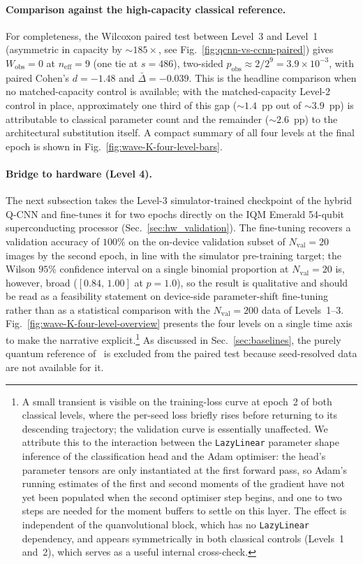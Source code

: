 \paragraph{Comparison against the high-capacity classical reference.}
For completeness, the Wilcoxon paired test between Level~3 and Level~1
(asymmetric in capacity by $\sim$$185\times$, see
Fig.~\ref{fig:qcnn-vs-ccnn-paired}) gives $W_{\mathrm{obs}}=0$
at $n_{\mathrm{eff}}=9$ (one tie at $s=486$), two-sided
$p_{\mathrm{obs}}\approx 2/2^{9}=3.9\times 10^{-3}$, with paired
Cohen's $d=-1.48$ and $\bar{\Delta}=-0.039$. This is the headline comparison when no matched-capacity control is
available; with the matched-capacity Level-2 control in place, approximately one third of this gap
($\sim$$1.4$~pp out of $\sim$$3.9$~pp) is attributable to classical
parameter count and the remainder ($\sim$$2.6$~pp) to the architectural
substitution itself. A compact summary of all four levels at the final
epoch is shown in Fig.~\ref{fig:wave-K-four-level-bars}.

\paragraph{Bridge to hardware (Level 4).}
The next subsection takes the Level-3 simulator-trained checkpoint of the
hybrid Q-CNN and fine-tunes it for two epochs directly on the IQM Emerald
54-qubit superconducting processor (Sec.~\ref{sec:hw_validation}). The
fine-tuning recovers a validation accuracy of $100\%$ on the on-device
validation subset of $N_{\mathrm{val}}=20$ images by the second epoch,
in line with the simulator pre-training target; the Wilson $95\%$
confidence interval on a single binomial proportion at $N_{\mathrm{val}}=20$
is, however, broad ($[0.84,\,1.00]$ at $p=1.0$), so the result is
qualitative and should be read as a feasibility statement on
device-side parameter-shift fine-tuning rather than as a statistical
comparison with the $N_{\mathrm{val}}=200$ data of Levels~1--3.
Fig.~\ref{fig:wave-K-four-level-overview} presents the four levels on a
single time axis to make the narrative explicit.\footnote{A small
transient is visible on the training-loss curve at epoch~2 of both
classical levels, where the per-seed loss briefly rises before returning
to its descending trajectory; the validation curve is essentially
unaffected. We attribute this to the interaction between the
\texttt{LazyLinear} parameter shape inference of the classification head
and the Adam optimiser: the head's parameter tensors are only
instantiated at the first forward pass, so Adam's running estimates of
the first and second moments of the gradient have not yet been populated
when the second optimiser step begins, and one to two steps are needed
for the moment buffers to settle on this layer. The effect is independent
of the quanvolutional block, which has no \texttt{LazyLinear} dependency,
and appears symmetrically in both classical controls (Levels~1 and~2),
which serves as a useful internal cross-check.} As discussed in
Sec.~\ref{sec:baselines}, the purely quantum reference
of~\cite{Sebastianelli2021} is excluded from the paired test because
seed-resolved data are not available for it.

